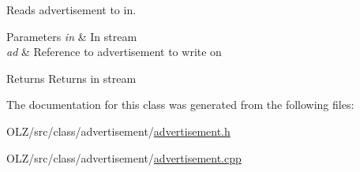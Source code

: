 Reads advertisement to in. 


\begin{DoxyParams}{Parameters}
{\em in} & In stream \\
\hline
{\em ad} & Reference to advertisement to write on\\
\hline
\end{DoxyParams}
\begin{DoxyReturn}{Returns}
Returns in stream 
\end{DoxyReturn}


The documentation for this class was generated from the following files\+:\begin{DoxyCompactItemize}
\item 
O\+L\+Z/src/class/advertisement/\hyperlink{advertisement_8h}{advertisement.\+h}\item 
O\+L\+Z/src/class/advertisement/\hyperlink{advertisement_8cpp}{advertisement.\+cpp}\end{DoxyCompactItemize}
